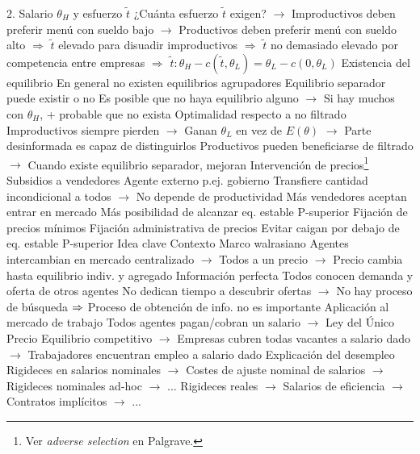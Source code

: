 \documentclass{nuevotema}
\begin{document}
\begin{esquemal}
				\4[] $2.$ Salario $\theta_H$ y esfuerzo $\tilde{t}$
				\4[] ¿Cuánta esfuerzo $\tilde{t}$ exigen?
				\4[] $\to$ Improductivos deben preferir menú con sueldo bajo
				\4[] $\to$ Productivos deben preferir menú con sueldo alto
				\4[] $\Rightarrow$ $\tilde{t}$ elevado para disuadir improductivos
				\4[] $\Rightarrow$ $\tilde{t}$ no demasiado elevado por competencia entre empresas
				\4[] $\Rightarrow$ $\tilde{t}: \theta_H - c(\tilde{t}, \theta_L) = \theta_L - c(0,\theta_L)$
				\4 Existencia del equilibrio
				\4[] En general no existen equilibrios agrupadores
				\4[] Equilibrio separador puede existir o no
				\4[] Es posible que no haya equilibrio alguno
				\4[] $\to$ Si hay muchos con $\theta_H$, + probable que no exista
				\4 Optimalidad respecto a no filtrado
				\4[] Improductivos siempre pierden
				\4[] $\to$ Ganan $\theta_L$ en vez de $E(\theta)$
				\4[] $\to$ Parte desinformada es capaz de distinguirlos
				\4[] Productivos pueden beneficiarse de filtrado
				\4[] $\to$ Cuando existe equilibrio separador, mejoran
		\2 Intervención de precios\footnote{Ver \textit{adverse selection} en Palgrave.}
			\3 Subsidios a vendedores
				\4 Agente externo p.ej. gobierno
				\4[] Transfiere cantidad incondicional a todos
				\4[] $\to$ No depende de productividad
				\4 Más vendedores aceptan entrar en mercado
				\4 Más posibilidad de alcanzar eq. estable P-superior
			\3 Fijación de precios mínimos
				\4 Fijación administrativa de precios
				\4 Evitar caigan por debajo de eq. estable P-superior
	\1 
		\2 Idea clave
			\3 Contexto
				\4 Marco walrasiano
				\4[] Agentes intercambian en mercado centralizado
				\4[] $\to$ Todos a un precio
				\4[] $\to$ Precio cambia hasta equilibrio indiv. y agregado
				\4 Información perfecta
				\4[] Todos conocen demanda y oferta de otros agentes
				\4[] No dedican tiempo a descubrir ofertas
				\4[] $\to$ No hay proceso de búsqueda
				\4[] $\Rightarrow$ Proceso de obtención de info. no es importante
				\4 Aplicación al mercado de trabajo
				\4[] Todos agentes pagan/cobran un salario
				\4[] $\to$ Ley del Único Precio
				\4[] Equilibrio competitivo
				\4[] $\to$ Empresas cubren todas vacantes a salario dado
				\4[] $\to$ Trabajadores encuentran empleo a salario dado
				\4 Explicación del desempleo
				\4[] Rigideces en salarios nominales
				\4[] $\to$ Costes de ajuste nominal de salarios
				\4[] $\to$ Rigideces nominales ad-hoc
				\4[] $\to$ ...
				\4[] Rigideces reales
				\4[] $\to$ Salarios de eficiencia
				\4[] $\to$ Contratos implícitos
				\4[] $\to$ ...

\end{esquemal}
\end{document}
